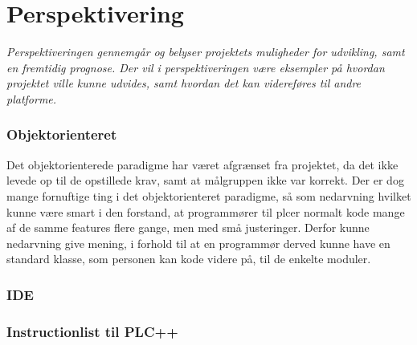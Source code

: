\chapter{Perspektivering}
\label{sec:Perspektivering}
\textit{Perspektiveringen gennemgår og belyser projektets muligheder for udvikling, samt en fremtidig prognose.
Der vil i perspektiveringen være eksempler på hvordan projektet ville kunne udvides, samt hvordan det kan videreføres til andre platforme.
}

\subsection*{Objektorienteret}
Det objektorienterede paradigme har været afgrænset fra projektet, da det ikke levede op til de opstillede krav, samt at målgruppen ikke var korrekt. 
Der er dog mange fornuftige ting i det objektorienteret paradigme, så som nedarvning hvilket kunne være smart i den forstand, at programmører til \gls{plc}er normalt kode mange af de samme features flere gange, men med små justeringer.
Derfor kunne nedarvning give mening, i forhold til at en programmør derved kunne have en standard klasse, som personen kan kode videre på, til de enkelte moduler.


\subsection*{IDE}

\subsection*{Instructionlist til PLC++}
